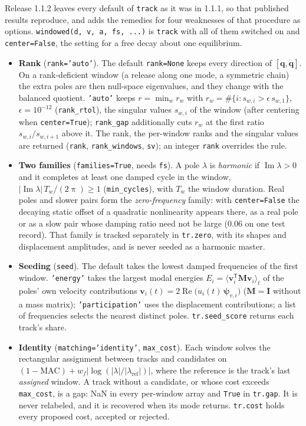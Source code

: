 \documentclass[report]{nld}
\theoremstyle{remark}\newtheorem*{remark}{Remark}
\newcommand{\code}[1]{\texttt{#1}}
\begin{document}
Release 1.1.2 leaves every default of \code{track} as it was in 1.1.1, so that
published results reproduce, and adds the remedies for four weaknesses of that
procedure as options. \code{windowed(d, v, a, fs, ...)} is \code{track} with
all of them switched on and \code{center=False}, the setting for a free decay
about one equilibrium.
\begin{itemize}
  \item \textbf{Rank} (\code{rank='auto'}). The default \code{rank=None} keeps
    every direction of $[\mathbf{q},\dot{\mathbf{q}}]$. On a rank-deficient
    window (a release along one mode, a symmetric chain) the extra poles are
    then null-space eigenvalues, and they change with the balanced quotient.
    \code{'auto'} keeps $r=\min_w r_w$ with
    $r_w=\#\{i: s_{w,i}>\epsilon\, s_{w,1}\}$, $\epsilon=10^{-12}$
    (\code{rank\_rtol}), the singular values $s_{w,i}$ of the window (after
    centering when \code{center=True}); \code{rank\_gap} additionally cuts $r_w$ at the first ratio
    $s_{w,i}/s_{w,i+1}$ above it. The rank, the per-window ranks and the
    singular values are returned (\code{rank}, \code{rank\_windows},
    \code{sv}); an integer \code{rank} overrides the rule.
  \item \textbf{Two families} (\code{families=True}, needs \code{fs}). A pole
    $\lambda$ is \emph{harmonic} if $\operatorname{Im}\lambda>0$ and it completes
    at least one damped cycle in the window,
    $|\operatorname{Im}\lambda|\,T_w/(2\uppi)\ge 1$ (\code{min\_cycles}), with
    $T_w$ the window duration. Real poles and slower pairs form the
    \emph{zero-frequency} family: with \code{center=False} the decaying static
    offset of a quadratic nonlinearity appears there, as a real pole or as a
    slow pair whose damping ratio need not be large (0.06 on one test record).
    That family is tracked separately in \code{tr.zero}, with its shapes and
    displacement amplitudes, and is never seeded as a harmonic master.
  \item \textbf{Seeding} (\code{seed}). The default takes the lowest damped
    frequencies of the first window. \code{'energy'} takes the largest modal
    energies $E_i=\langle \mathbf{v}_i^{\mathsf{T}}\mathbf{M}\mathbf{v}_i\rangle_t$
    of the poles' own velocity contributions
    $\mathbf{v}_i(t)=2\operatorname{Re}\bigl(u_i(t)\,\symbf{\psi}_{v,i}\bigr)$
    ($\mathbf{M}=\mathbf{I}$ without a mass matrix); \code{'participation'}
    uses the displacement contributions; a list of frequencies selects the
    nearest distinct poles. \code{tr.seed\_score} returns each track's share.
  \item \textbf{Identity} (\code{matching='identity'}, \code{max\_cost}). Each
    window solves the rectangular assignment between tracks and candidates on
    $(1-\mathrm{MAC})+w_f|\log(|\lambda|/|\lambda_{\mathrm{ref}}|)|$, where the
    reference is the track's last \emph{assigned} window. A track without a
    candidate, or whose cost exceeds \code{max\_cost}, is a gap: NaN in every
    per-window array and \code{True} in \code{tr.gap}. It is never relabeled,
    and it is recovered when its mode returns. \code{tr.cost} holds every
    proposed cost, accepted or rejected.
\end{itemize}
\end{document}
